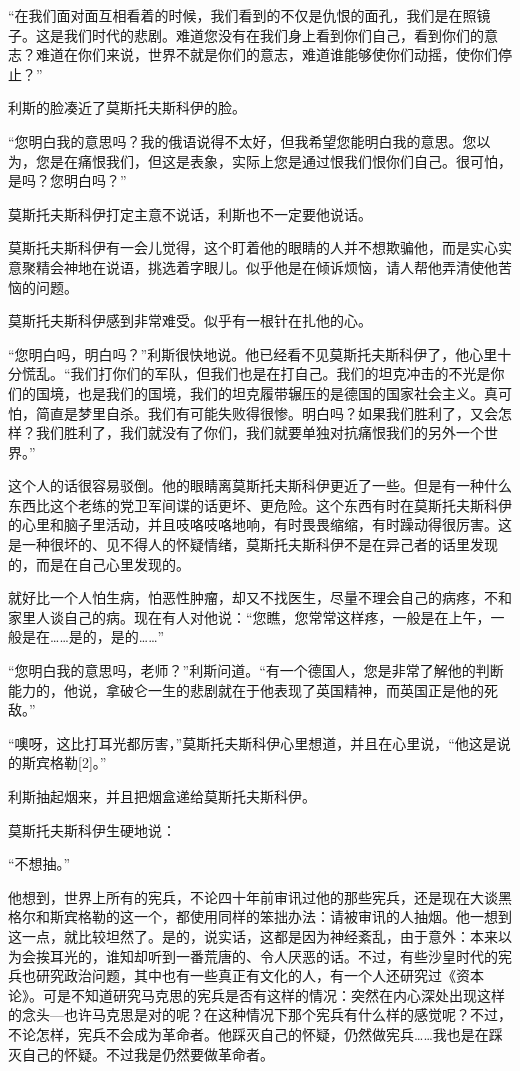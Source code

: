 “在我们面对面互相看着的时候，我们看到的不仅是仇恨的面孔，我们是在照镜子。这是我们时代的悲剧。难道您没有在我们身上看到你们自己，看到你们的意志？难道在你们来说，世界不就是你们的意志，难道谁能够使你们动摇，使你们停止？”

利斯的脸凑近了莫斯托夫斯科伊的脸。

“您明白我的意思吗？我的俄语说得不太好，但我希望您能明白我的意思。您以为，您是在痛恨我们，但这是表象，实际上您是通过恨我们恨你们自己。很可怕，是吗？您明白吗？”

莫斯托夫斯科伊打定主意不说话，利斯也不一定要他说话。

莫斯托夫斯科伊有一会儿觉得，这个盯着他的眼睛的人并不想欺骗他，而是实心实意聚精会神地在说语，挑选着字眼儿。似乎他是在倾诉烦恼，请人帮他弄清使他苦恼的问题。

莫斯托夫斯科伊感到非常难受。似乎有一根针在扎他的心。

“您明白吗，明白吗？”利斯很快地说。他已经看不见莫斯托夫斯科伊了，他心里十分慌乱。“我们打你们的军队，但我们也是在打自己。我们的坦克冲击的不光是你们的国境，也是我们的国境，我们的坦克履带辗压的是德国的国家社会主义。真可怕，简直是梦里自杀。我们有可能失败得很惨。明白吗？如果我们胜利了，又会怎样？我们胜利了，我们就没有了你们，我们就要单独对抗痛恨我们的另外一个世界。”

这个人的话很容易驳倒。他的眼睛离莫斯托夫斯科伊更近了一些。但是有一种什么东西比这个老练的党卫军间谍的话更坏、更危险。这个东西有时在莫斯托夫斯科伊的心里和脑子里活动，并且吱咯吱咯地响，有时畏畏缩缩，有时躁动得很厉害。这是一种很坏的、见不得人的怀疑情绪，莫斯托夫斯科伊不是在异己者的话里发现的，而是在自己心里发现的。

就好比一个人怕生病，怕恶性肿瘤，却又不找医生，尽量不理会自己的病疼，不和家里人谈自己的病。现在有人对他说：“您瞧，您常常这样疼，一般是在上午，一般是在……是的，是的……”

“您明白我的意思吗，老师？”利斯问道。“有一个德国人，您是非常了解他的判断能力的，他说，拿破仑一生的悲剧就在于他表现了英国精神，而英国正是他的死敌。”

“噢呀，这比打耳光都厉害，”莫斯托夫斯科伊心里想道，并且在心里说，“他这是说的斯宾格勒[2]。”

利斯抽起烟来，并且把烟盒递给莫斯托夫斯科伊。

莫斯托夫斯科伊生硬地说：

“不想抽。”

他想到，世界上所有的宪兵，不论四十年前审讯过他的那些宪兵，还是现在大谈黑格尔和斯宾格勒的这一个，都使用同样的笨拙办法：请被审讯的人抽烟。他一想到这一点，就比较坦然了。是的，说实话，这都是因为神经紊乱，由于意外：本来以为会挨耳光的，谁知却听到一番荒唐的、令人厌恶的话。不过，有些沙皇时代的宪兵也研究政治问题，其中也有一些真正有文化的人，有一个人还研究过《资本论》。可是不知道研究马克思的宪兵是否有这样的情况：突然在内心深处出现这样的念头—也许马克思是对的呢？在这种情况下那个宪兵有什么样的感觉呢？不过，不论怎样，宪兵不会成为革命者。他踩灭自己的怀疑，仍然做宪兵……我也是在踩灭自己的怀疑。不过我是仍然要做革命者。


